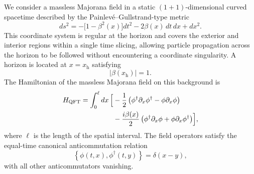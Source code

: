 \documentclass[reprint,amsmath,amssymb,aps,prb,floatfix,showkeys,superscriptaddress]{revtex4-2}
\begin{document}
We consider a massless Majorana field in a static
$(1+1)$-dimensional curved spacetime described by the
Painlev\'e--Gullstrand-type metric
\begin{equation}
  ds^2
  =
  -\bigl[1-\beta^2(x)\bigr]dt^2
  -2\beta(x)\,dt\,dx
  +dx^2.
  \label{eq:PG_metric}
\end{equation}
This coordinate system is regular at the horizon and covers the
exterior and interior regions within a single time slicing, allowing
particle propagation across the horizon to be followed without
encountering a coordinate singularity. A horizon is located at
$x=x_{\mathrm h}$ satisfying
\begin{equation}
  \bigl|\beta(x_{\mathrm h})\bigr|=1.
  \label{eq:horizon_condition}
\end{equation}
The Hamiltonian of the massless Majorana field on this background is
\begin{equation}
\begin{aligned}
  H_{\mathrm{QFT}}
  =
  \int_0^\ell dx\,
  \Bigl[
  &-\frac{1}{2}
  \left(
    \phi^\dagger\partial_x\phi^\dagger
    -
    \phi\partial_x\phi
  \right)
  \\
  &-\frac{i\beta(x)}{2}
  \left(
    \phi^\dagger\partial_x\phi
    +
    \phi\partial_x\phi^\dagger
  \right)
  \Bigr],
\end{aligned}
  \label{eq:continuum_Hamiltonian}
\end{equation}
where $\ell$ is the length of the spatial interval. The field
operators satisfy the equal-time canonical anticommutation relation
\begin{equation}
  \left\{
    \phi(t,x),\phi^{\dagger}(t,y)
  \right\}
  =
  \delta(x-y),
\label{eq:continuum_anticommutation}
\end{equation}
with all other anticommutators vanishing.
\end{document}
